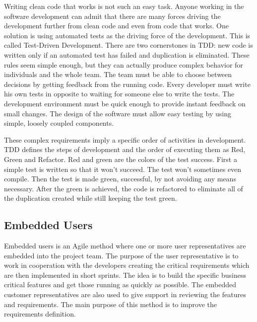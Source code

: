 Writing clean code that works is not such an easy task. Anyone working in the software development can admit that there are many forces driving the development further from clean code and even from code that works. One solution is using automated tests as the driving force of the development. This is called Test-Driven Development. There are two cornerstones in TDD: new code is written only if an automated test has failed and duplication is eliminated. These rules seem simple enough, but they can actually produce complex behavior for individuals and the whole team. The team must be able to choose between decisions by getting feedback from the running code. Every developer must write his own tests in opposite to waiting for someone else to write the tests. The development environment must be quick enough to provide instant feedback on small changes. The design of the software must allow easy testing by using simple, loosely coupled components.

These complex requirements imply a specific order of activities in development. TDD defines the steps of development and the order of executing them as Red, Green and Refactor. Red and green are the colors of the test success. First a simple test is written so that it won't succeed. The test won't sometimes even compile. Then the test is made green, successful, by not avoiding any means necessary. After the green is achieved, the code is refactored to eliminate all of the duplication created while still keeping the test green.~\cite{beck2003test}














\subsection{Embedded Users} 
Embedded users is an Agile method where one or more user representatives are embedded into the project team. The purpose of the user representative is to work in cooperation with the developers creating the critical requirements which are then implemented in short sprints. The idea is to build the specific business critical features and get those running as quickly as possible. The embedded customer representatives are also used to give support in reviewing the features and requirements. The main purpose of this method is to improve the requirements definition.

